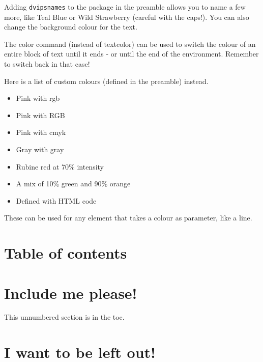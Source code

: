 \documentclass[12pt, letterpaper]{article} %
\begin{document}
Adding \texttt{dvipsnames} to the package in the preamble allows you to name a few more, like \textcolor{TealBlue}{Teal Blue} or \textcolor{WildStrawberry}{Wild Strawberry} (careful with the caps!). You can also change \colorbox{BurntOrange}{the background colour} for the text.

The color command (instead of textcolor) can be used \color{cyan}to switch the colour of an entire block of text until it ends - or until the end of the environment. Remember to \color{black} switch back in that case!

Here is a list of custom colours (defined in the preamble) instead.
\begin{itemize}
	\item \textcolor{mypink1}{Pink with rgb}
	\item \textcolor{mypink2}{Pink with RGB}
	\item \textcolor{mypink3}{Pink with cmyk}
	\item \textcolor{mygray}{Gray with gray}
	\item \textcolor{LightRubineRed}{Rubine red at 70\% intensity} %
	\item \textcolor{OrangeGreen}{A mix of 10\% green and 90\% orange}
	\item \textcolor{HTMLColor}{Defined with HTML code}
\end{itemize}

These can be used for any element that takes a colour as parameter, like a line.

\noindent {\color{TealBlue} \rule{\linewidth}{1mm}} %

\clearpage
\section{Table of contents}

\tableofcontents


\section*{Include me please!}

This unnumbered section is in the toc.

\section*{I want to be left out!}
\end{document}
